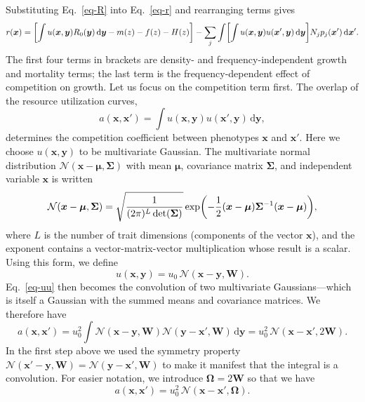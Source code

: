 \documentclass{article}
\newcommand{\mat}[1]{\bm{#1}}
\newcommand{\ud}{\text{d}}
\let\originalleft\left
\let\originalright\right
\renewcommand{\left}{\mathopen{}\mathclose\bgroup\originalleft}
\renewcommand{\right}{\aftergroup\egroup\originalright}
\begin{document}
Substituting Eq.~\ref{eq-R} into Eq.~\ref{eq-r} and rearranging terms gives
\begin{equation}
  \label{eq-r-u}
  r(\mat{x})
  = \left[ \int u(\mat{x}, \mat{y}) R_0(\mat{y}) \,\ud\mat{y}
  - m(z)
  - f(z)
  - H(z) \right]
  - \sum_j \int \left[ \int u(\mat{x}, \mat{y})
  u(\mat{x}', \mat{y}) \,\ud\mat{y} \right]
  N_j p_j(\mat{x}') \,\ud\mat{x}'.
\end{equation}
The first four terms in brackets are density- and frequency-independent growth and mortality terms; the last term is the frequency-dependent effect of competition on growth. Let us focus on the competition term first. The overlap of the resource utilization curves,
\begin{equation}
  \label{eq-uu}
  a(\mat{x}, \mat{x}')
  = \int u(\mat{x}, \mat{y}) u(\mat{x}', \mat{y}) \,\ud\mat{y},
\end{equation}
determines the competition coefficient between phenotypes $\mat{x}$ and $\mat{x}'$. Here we choose $u(\mat{x}, \mat{y})$ to be multivariate Gaussian. The multivariate normal distribution $\mathcal{N}(\mat{x} - \mat{\mu}, \mat{\Sigma})$ with mean $\mat{\mu}$, covariance matrix $\mat{\Sigma}$, and independent variable $\mat{x}$ is written
\begin{equation}
  \label{eq-multinorm}
  \mathcal{N}(\mat{x} - \mat{\mu}, \mat{\Sigma})
  = \sqrt{\frac{1}{(2\pi)^L \det(\mat{\Sigma})}}
  \exp \left( -\frac{1}{2}
  (\mat{x}-\mat{\mu}) \mat{\Sigma}^{-1} (\mat{x}-\mat{\mu})
  \right) ,
\end{equation}
where $L$ is the number of trait dimensions (components of the vector $\mat{x}$), and the exponent contains a vector-matrix-vector multiplication whose result is a scalar. Using this form, we define
\begin{equation}
  \label{eq-u}
  u(\mat{x}, \mat{y})
  = u_0 \, \mathcal{N}(\mat{x} - \mat{y}, \mat{W}) .
\end{equation}
Eq.~\ref{eq-uu} then becomes the convolution of two multivariate Gaussians---which is itself a Gaussian with the summed means and covariance matrices. We therefore have
\begin{equation}
  \label{eq-a-calc}
  a(\mat{x}, \mat{x}')
  = u_0^2 \int \mathcal{N}(\mat{x} - \mat{y}, \mat{W})
  \mathcal{N}(\mat{y} - \mat{x}', \mat{W}) \,\ud\mat{y}
  = u_0^2 \, \mathcal{N}(\mat{x} - \mat{x}', 2\mat{W}) .
\end{equation}
In the first step above we used the symmetry property $\mathcal{N}(\mat{x}' - \mat{y}, \mat{W}) = \mathcal{N}(\mat{y} - \mat{x}', \mat{W})$ to make it manifest that the integral is a convolution. For easier notation, we introduce $\mat{\Omega} = 2\mat{W}$ so that we have
\begin{equation}
  \label{eq-a}
  a(\mat{x}, \mat{x}')
  = u_0^2 \, \mathcal{N}(\mat{x} - \mat{x}', \mat{\Omega}) .
\end{equation}
\end{document}
